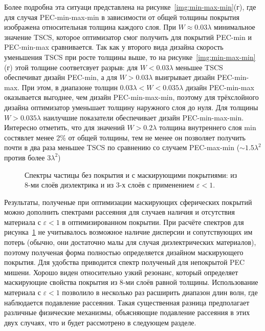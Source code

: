 Более подробна эта ситуаци представлена на
рисунке~\ref{img:min-max-min}(г), где для случая PEC-min-max-min в
зависимости от общей толщины покрытия изображена относительная толщина
каждого слоя. При $W\approx0.03\lambda$ минимальное значение TSCS,
которое оптимизатор смог получить для покрытий PEC-min и PEC-min-max
сравнивается. Так как у второго вида дизайна скорость уменьшения TSCS
при росте толщины выше, то на рисунке~\ref{img:min-max-min}(г) этой
толщине соответсвует разрыв: для $W<0.03\lambda$ меньшее TSCS
обеспечиват дизайн PEC-min, а для $W>0.03\lambda$ выигрывает дизайн
PEC-min-max. При этом, в диапазоне толщин
$0.03\lambda < W < 0.035\lambda$ дизайн PEC-min-max оказывается
выгоднее, чем дизайн PEC-min-max-min, поэтому для трёхслойного дизайна
оптимизатор уменьшает толщину наружного слоя до нуля. Для толщины
$W>0.035\lambda$ наилучшие показатели обеспечивает дизайн
PEC-min-max-min. Интересно отметить, что для значений 
$W>0.2\lambda$ толщина внутреннего слоя min состявлет менее 2\% от
общей толщины, тем не менее он позволяет получить почти в два раза
меньшее TSCS по сравнению со случаем PEC-max-min ($\sim
1.5\lambda^2$ против более $3 \lambda^2$)

\begin{figure}[t]
  \centering
  \caption{ Спектры частицы без покрытия и с маскирующими
    покрытиями: из 8-ми слоёв диэлектрика и из 3-х слоёв с применением
    ${\varepsilon<1}$.\label{img:index07-spectra}
    }
\end{figure}
Результаты, полученые при оптимизации маскирующих сферических покрытий
можно дополнить спектрами рассеяния для случаев наличия и отсутствия
материала с ${\varepsilon<1}$ в оптимизированном покрытии.  При
расчёте спектров для рисунка~\ref{img:index07-spectra} не учитывалось
возможное наличие дисперсии и сопутствующих им потерь (обычно, они
достаточно малы для случая диэлектрических материалов), поэтому
полученая форма полностью определяется дизайном маскирующего
покрытия. Для удобства приводится спектр полученый для непокрытой PEC
мишени.  Хорошо виден относительно узкий резонанс, который определяет
маскирующие свойства покрытия из 8-ми слоёв равной
толщины. Использование материала с ${\varepsilon<1}$ позволило в
несколько раз расширить диапазон длин волн, где наблюдается подавление
рассеяния.  Такая существенная разница предполагает различные
физические механизмы, объясняющие подавление рассеяния в этих двух
случаях, что и будет рассмотрено в следующем разделе.

